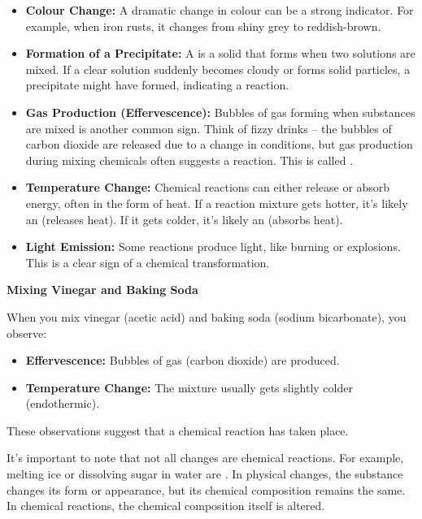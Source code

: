\begin{itemize}
    \item \textbf{Colour Change:}  A dramatic change in colour can be a strong indicator. For example, when iron rusts, it changes from shiny grey to reddish-brown.
    \item \textbf{Formation of a Precipitate:}  A  is a solid that forms when two solutions are mixed. If a clear solution suddenly becomes cloudy or forms solid particles, a precipitate might have formed, indicating a reaction.
    \item \textbf{Gas Production (Effervescence):}  Bubbles of gas forming when substances are mixed is another common sign. Think of fizzy drinks – the bubbles of carbon dioxide are released due to a change in conditions, but gas production during mixing chemicals often suggests a reaction. This is called .
    \item \textbf{Temperature Change:}  Chemical reactions can either release or absorb energy, often in the form of heat. If a reaction mixture gets hotter, it's likely an  (releases heat). If it gets colder, it's likely an  (absorbs heat).
    \item \textbf{Light Emission:}  Some reactions produce light, like burning or explosions. This is a clear sign of a chemical transformation.
\end{itemize}

\begin{example}
\textbf{Mixing Vinegar and Baking Soda}

When you mix vinegar (acetic acid) and baking soda (sodium bicarbonate), you observe:

\begin{itemize}
    \item \textbf{Effervescence:} Bubbles of gas (carbon dioxide) are produced.
    \item \textbf{Temperature Change:} The mixture usually gets slightly colder (endothermic).
\end{itemize}
These observations suggest that a chemical reaction has taken place.
\end{example}

It's important to note that not all changes are chemical reactions. For example, melting ice or dissolving sugar in water are . In physical changes, the substance changes its form or appearance, but its chemical composition remains the same.  In chemical reactions, the chemical composition itself is altered.

